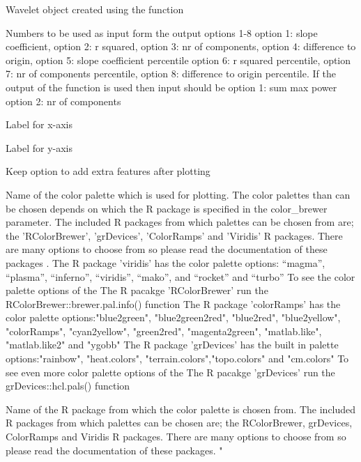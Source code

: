 \documentclass[a4paper]{book}
\begin{document}
%
\begin{Arguments}
\begin{ldescription}
\item[\code{model\_results}] Wavelet object created using the  function

\item[\code{plot\_res}] Numbers to be used as input form the output
options 1-8 option 1: slope coefficient, option 2: r squared,
option 3: nr of components, option 4: difference to origin, option 5: slope coefficient percentile
option 6: r squared percentile, option 7: nr of components percentile,
option 8: difference to origin percentile. If the output of the   function is used
then input should be option 1: sum max power option 2: nr of components

\item[\code{x\_lab}] Label for x-axis 

\item[\code{y\_lab}] Label for y-axis 

\item[\code{keep\_editable}] Keep option to add extra features after plotting  

\item[\code{palette\_name}] Name of the color palette which is used for plotting.
The color palettes than can be chosen depends on which the R package is specified in
the color\_brewer parameter. The included R packages from which palettes can be chosen
from are; the 'RColorBrewer', 'grDevices', 'ColorRamps' and 'Viridis' R packages.
There are many options to choose from so please
read the documentation of these packages .
The R package 'viridis' has the color palette options: “magma”, “plasma”,
“inferno”, “viridis”, “mako”, and “rocket”  and “turbo”
To see the color palette options of the The R pacakge 'RColorBrewer' run
the RColorBrewer::brewer.pal.info() function
The R package 'colorRamps' has the color palette options:"blue2green",
"blue2green2red", "blue2red",    "blue2yellow", "colorRamps",    "cyan2yellow",
"green2red", "magenta2green", "matlab.like", "matlab.like2" and    "ygobb"
The R package 'grDevices' has the built in  palette options:"rainbow",
"heat.colors", "terrain.colors","topo.colors" and "cm.colors"
To see even more color palette options of the The R pacakge 'grDevices' run
the grDevices::hcl.pals() function

\item[\code{color\_brewer}] Name of the R package from which the color palette is chosen from.
The included R packages from which palettes can be chosen
are; the RColorBrewer, grDevices, ColorRamps and Viridis R packages.
There are many options to choose from so please
read the documentation of these packages. "
\end{ldescription}
\end{Arguments}
\end{document}
